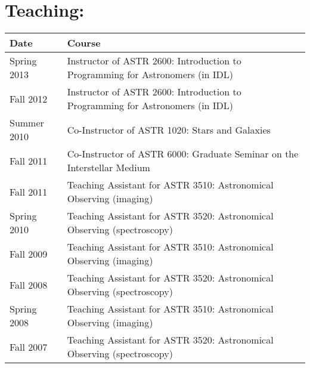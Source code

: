 \setlength{\extrarowheight}{0pt}
\section*{Teaching: }
\vspace{-12pt}
\begin{tabular}{ll}
                 Date         & Course \\
                \hline
     Spring 2013  &   Instructor of ASTR 2600: Introduction to Programming for Astronomers (in IDL) \\
     Fall 2012    &   Instructor of ASTR 2600: Introduction to Programming for Astronomers (in IDL) \\
     Summer 2010  &   Co-Instructor of ASTR 1020: Stars and Galaxies \\
     Fall 2011    &   Co-Instructor of ASTR 6000: Graduate Seminar on the Interstellar Medium \\
     Fall 2011    &   Teaching Assistant for ASTR 3510: Astronomical Observing (imaging) \\
     Spring 2010  &   Teaching Assistant for ASTR 3520: Astronomical Observing (spectroscopy) \\
     Fall 2009    &   Teaching Assistant for ASTR 3510: Astronomical Observing (imaging) \\
     Fall 2008    &   Teaching Assistant for ASTR 3520: Astronomical Observing (spectroscopy) \\
     Spring 2008  &   Teaching Assistant for ASTR 3510: Astronomical Observing (imaging) \\
     Fall 2007    &   Teaching Assistant for ASTR 3520: Astronomical Observing (spectroscopy) \\
\end{tabular}

